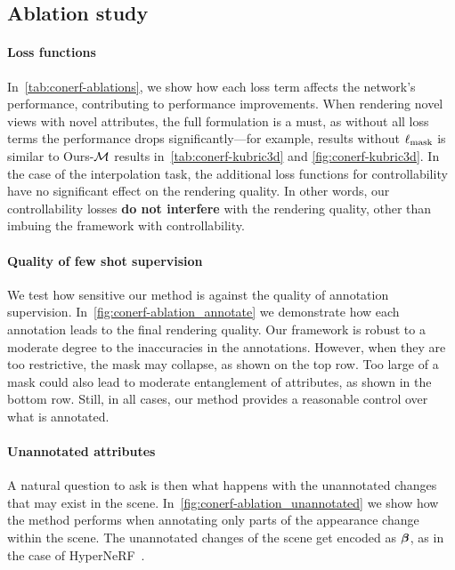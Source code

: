   \subsection{Ablation study}
    
    \paragraph{Loss functions}
      In~\cref{tab:conerf-ablations}, we show how each loss term affects the
      network's performance, contributing to performance improvements.
      When rendering novel views with novel attributes, the full formulation is a
      must, as without all loss terms the performance drops significantly---for
      example, results without $\ell_{\text{mask}}$ is similar to Ours-$\mathcal{M}$ results
      in~\cref{tab:conerf-kubric3d} and \cref{fig:conerf-kubric3d}.
      In the case of the interpolation task, the additional loss functions for
      controllability have no significant effect on the rendering quality.
      In other words, our controllability losses \textbf{do not interfere} with the
      rendering quality, other than imbuing the framework with controllability.
      \vspace{-0.2em}

      
    \paragraph{Quality of few shot supervision}
      We test how sensitive our method is against the quality of annotation
      supervision.
      In~\cref{fig:conerf-ablation_annotate} we demonstrate how each annotation
      leads to the final rendering quality.
      Our framework is robust to a moderate degree to the inaccuracies in the
      annotations.
      However, when they are too restrictive, the mask may collapse, as shown on the
      top row.
      Too large of a mask could also lead to moderate entanglement of attributes, as
      shown in the bottom row.
      Still, in all cases, our method provides a reasonable control over what is
      annotated.

      
    \paragraph{Unannotated attributes}
      A natural question to ask is then what happens with the unannotated changes
      that may exist in the scene.
      In~\cref{fig:conerf-ablation_unannotated} we show how the method performs when
      annotating only parts of the appearance change within the scene.
      The unannotated changes of the scene get encoded as ${\boldsymbol{\beta}}$, as in the case
      of HyperNeRF~\cite{park2021hypernerf}.

